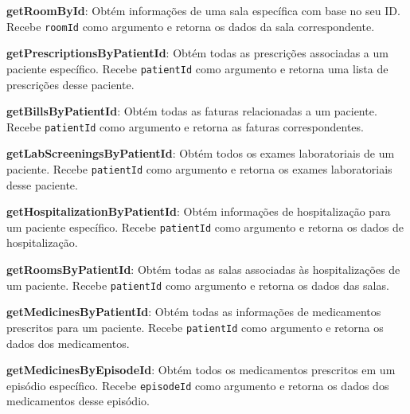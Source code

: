 \vspace{0.15cm}

\textbf{getRoomById}: Obtém informações de uma sala específica com base no seu ID. Recebe \texttt{roomId} como argumento e retorna os dados da sala correspondente.

\vspace{0.15cm}

\textbf{getPrescriptionsByPatientId}: Obtém todas as prescrições associadas a um paciente específico. Recebe \texttt{patientId} como argumento e retorna uma lista de prescrições desse paciente.

\vspace{0.15cm}

\textbf{getBillsByPatientId}: Obtém todas as faturas relacionadas a um paciente. Recebe \texttt{patientId} como argumento e retorna as faturas correspondentes.

\vspace{0.15cm}

\textbf{getLabScreeningsByPatientId}: Obtém todos os exames laboratoriais de um paciente. Recebe \texttt{patientId} como argumento e retorna os exames laboratoriais desse paciente.

\vspace{0.15cm}

\textbf{getHospitalizationByPatientId}: Obtém informações de hospitalização para um paciente específico. Recebe \texttt{patientId} como argumento e retorna os dados de hospitalização.

\vspace{0.15cm}

\textbf{getRoomsByPatientId}: Obtém todas as salas associadas às hospitalizações de um paciente. Recebe \texttt{patientId} como argumento e retorna os dados das salas.

\vspace{0.15cm}

\textbf{getMedicinesByPatientId}: Obtém todas as informações de medicamentos prescritos para um paciente. Recebe \texttt{patientId} como argumento e retorna os dados dos medicamentos.

\vspace{0.15cm}

\textbf{getMedicinesByEpisodeId}: Obtém todos os medicamentos prescritos em um episódio específico. Recebe \texttt{episodeId} como argumento e retorna os dados dos medicamentos desse episódio.

\vspace{0.15cm}

